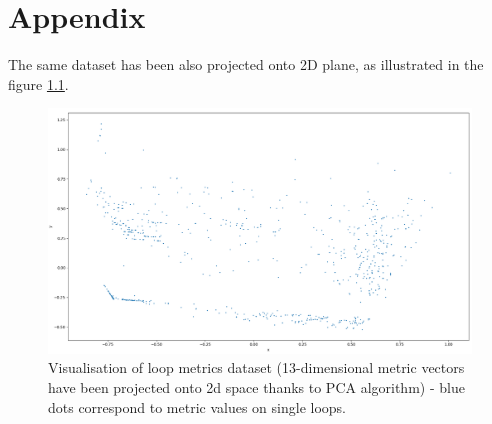 \chapter{Appendix}
\label{appendix}

\qquad The same dataset has been also projected onto 2D plane, as illustrated in the figure \ref{metrics-pca-13-to-2}.

\begin{figure}[htb]
	\centering
	\includegraphics[width=\linewidth]{figs/metrics-pca-13-to-2.png}
	\caption{Visualisation of loop metrics dataset (13-dimensional metric vectors have been projected onto 2d space thanks to PCA algorithm) - blue dots correspond to metric values on single loops.}
	\label{metrics-pca-13-to-2}
\end{figure}

